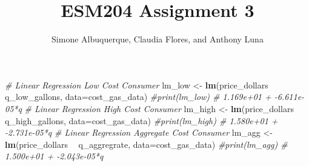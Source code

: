 \documentclass[]{article}
\title{ESM204 Assignment 3}
\author{Simone Albuquerque, Claudia Flores, and Anthony Luna}
\date{}
\newenvironment{Shaded}{\begin{snugshade}}{\end{snugshade}}
\newcommand{\CommentTok}[1]{\textcolor[rgb]{0.56,0.35,0.01}{\textit{#1}}}
\newcommand{\DataTypeTok}[1]{\textcolor[rgb]{0.13,0.29,0.53}{#1}}
\newcommand{\KeywordTok}[1]{\textcolor[rgb]{0.13,0.29,0.53}{\textbf{#1}}}
\newcommand{\NormalTok}[1]{#1}
\newcommand{\OperatorTok}[1]{\textcolor[rgb]{0.81,0.36,0.00}{\textbf{#1}}}
\newcommand{\StringTok}[1]{\textcolor[rgb]{0.31,0.60,0.02}{#1}}
\begin{document}
\maketitle

\begin{Shaded}
\end{Shaded}

\begin{Shaded}
\begin{Highlighting}[]
\CommentTok{# Linear Regression Low Cost Consumer }
\NormalTok{lm_low <-}\StringTok{ }\KeywordTok{lm}\NormalTok{(price_dollars }\OperatorTok{~}\StringTok{ }\NormalTok{q_low_gallons, }\DataTypeTok{data=}\NormalTok{cost_gas_data) }
\CommentTok{#print(lm_low)  #  1.169e+01 + -6.611e-05*q}
\CommentTok{# Linear Regression High Cost Consumer}
\NormalTok{lm_high <-}\StringTok{ }\KeywordTok{lm}\NormalTok{(price_dollars }\OperatorTok{~}\StringTok{ }\NormalTok{q_high_gallons, }\DataTypeTok{data=}\NormalTok{cost_gas_data) }
\CommentTok{#print(lm_high)  #  1.580e+01 + -2.731e-05*q}
\CommentTok{# Linear Regression Aggregate Cost Consumer}
\NormalTok{lm_agg <-}\StringTok{ }\KeywordTok{lm}\NormalTok{(price_dollars }\OperatorTok{~}\StringTok{ }\NormalTok{q_aggregrate, }\DataTypeTok{data=}\NormalTok{cost_gas_data) }
\CommentTok{#print(lm_agg)  #  1.500e+01 + -2.043e-05*q}
\end{Highlighting}
\end{Shaded}
\end{document}
